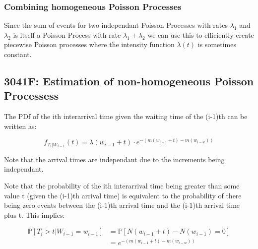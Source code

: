    \subsubsection{Combining homogeneous Poisson Processes}
    Since the sum of events for two independant Poisson Processes with rates 
    \(\lambda_1\) and \(\lambda_2\) is itself a Poisson Process with rate \(\lambda_1 + \lambda_2\)
    we can use this to efficiently create piecewise Poisson processes where the 
    intensity function \(\lambda(t)\) is sometimes constant.
    \subsection{3041F: Estimation of non-homogeneous Poisson Processess}
    The PDf of the ith interarrival time given the waiting time of the (i-1)th can be written as:

    \begin{equation*}
        f_{T_i | W_{i-1}}(t) = 
        \lambda(w_{i-1} + t) \cdot e^{-\left(m(w_{i-1} + t) - m(w_{i-w})\right)}
    \end{equation*}

    Note that the arrival times are independant due to the increments being independant. \newline \newline

    Note that the probability of the ith interarrival time being greater than some value t (given 
    the (i-1)th arrival time) is equivalent to the probability of there being zero events between 
    the (i-1)th arrival time and the (i-1)th arrival time plus t. This implies:

    \begin{equation*}
        \begin{aligned}
            \mathbb{P}[T_i > t | W_{i-1} = w_{i-1}] &= \mathbb{P}[N(w_{i-1} + t) - N(w_{i-1}) = 0] \\
                                                    &=  e^{-\left(m(w_{i-1} + t) - m(w_{i-w})\right)} \\
        \end{aligned}
    \end{equation*}
